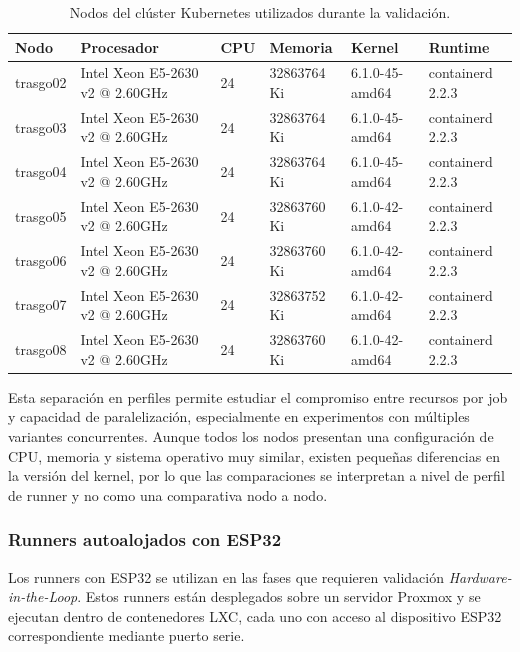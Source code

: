 \begin{table}[htbp]
    \centering
    \caption{Nodos del clúster Kubernetes utilizados durante la validación.}
    \label{tab:nodos-kubernetes-validacion}
    \begin{tabular}{p{}p{}p{}p{}p{}p{}}
        \hline
        \textbf{Nodo} & \textbf{Procesador} & \textbf{CPU} & \textbf{Memoria} & \textbf{Kernel} & \textbf{Runtime} \\
        \hline
        trasgo02 & Intel Xeon E5-2630 v2 @ 2.60GHz & 24 & 32863764 Ki & 6.1.0-45-amd64 & containerd 2.2.3 \\
        trasgo03 & Intel Xeon E5-2630 v2 @ 2.60GHz & 24 & 32863764 Ki & 6.1.0-45-amd64 & containerd 2.2.3 \\
        trasgo04 & Intel Xeon E5-2630 v2 @ 2.60GHz & 24 & 32863764 Ki & 6.1.0-45-amd64 & containerd 2.2.3 \\
        trasgo05 & Intel Xeon E5-2630 v2 @ 2.60GHz & 24 & 32863760 Ki & 6.1.0-42-amd64 & containerd 2.2.3 \\
        trasgo06 & Intel Xeon E5-2630 v2 @ 2.60GHz & 24 & 32863760 Ki & 6.1.0-42-amd64 & containerd 2.2.3 \\
        trasgo07 & Intel Xeon E5-2630 v2 @ 2.60GHz & 24 & 32863752 Ki & 6.1.0-42-amd64 & containerd 2.2.3 \\
        trasgo08 & Intel Xeon E5-2630 v2 @ 2.60GHz & 24 & 32863760 Ki & 6.1.0-42-amd64 & containerd 2.2.3 \\
        \hline
    \end{tabular}
\end{table}

Esta separación en perfiles permite estudiar el compromiso entre recursos por job y capacidad de paralelización, especialmente en experimentos con múltiples variantes concurrentes. Aunque todos los nodos presentan una configuración de CPU, memoria y sistema operativo muy similar, existen pequeñas diferencias en la versión del kernel, por lo que las comparaciones se interpretan a nivel de perfil de runner y no como una comparativa nodo a nodo.

\subsubsection{Runners autoalojados con ESP32}
\label{subsubsec:entorno-esp32-validacion}

Los runners con ESP32 se utilizan en las fases que requieren validación \textit{Hardware-in-the-Loop}. Estos runners están desplegados sobre un servidor Proxmox y se ejecutan dentro de contenedores LXC, cada uno con acceso al dispositivo ESP32 correspondiente mediante puerto serie.

